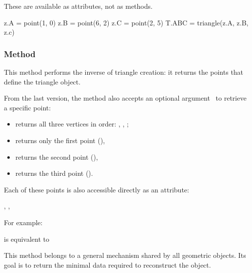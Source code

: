 \noindent
These are available as attributes, not as methods.

\vspace{1em}
\begin{mybox}
  \begin{tkzexample}
    z.A = point(1, 0)
    z.B = point(6, 2)
    z.C = point(2, 5)
    T.ABC = triangle(z.A, z.B, z.c)
  \end{tkzexample}
\end{mybox}

\subsubsection{Method }
\label{ssub:method_triangle_get}

This method performs the inverse of triangle creation: it returns the points that define the triangle object.

\medskip
\noindent
From the last version, the method also accepts an optional argument~ to retrieve a specific point:
\begin{itemize}
  \item {} returns all three vertices in order: , , ;
  \item {} returns only the first point (),
  \item {} returns the second point (),
  \item {} returns the third point ().
\end{itemize}

\medskip
\noindent
Each of these points is also accessible directly as an attribute:
\begin{center}
, , 
\end{center}
For example:
\begin{center}
 is equivalent to 
\end{center}

\medskip
\noindent
This method belongs to a general mechanism shared by all geometric objects. Its goal is to return the minimal data required to reconstruct the object.

\vspace{1em}

